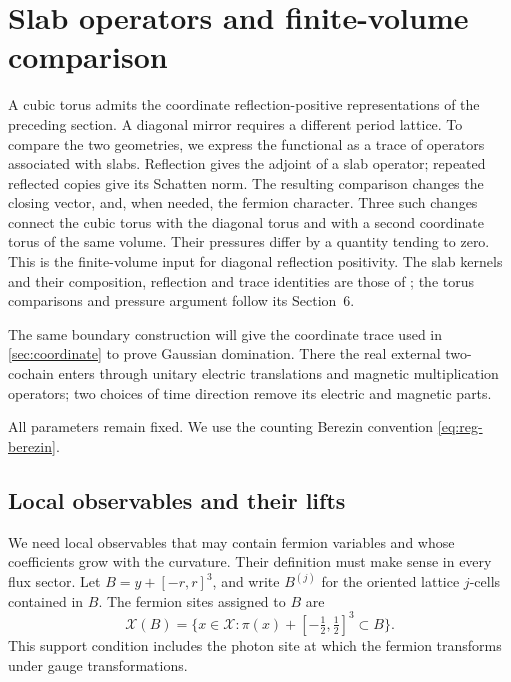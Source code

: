 \section{Slab operators and finite-volume comparison}\label{sec:slab-comparison}

A cubic torus admits the coordinate reflection-positive representations
of the preceding section. A diagonal mirror requires a different period
lattice. To compare the two geometries, we express the functional as a
trace of operators associated with slabs. Reflection gives the adjoint
of a slab operator; repeated reflected copies give its Schatten norm.
The resulting comparison changes the closing vector, and, when needed,
the fermion character. Three such changes connect the cubic torus with
the diagonal torus and with a second coordinate torus of the same volume.
Their pressures differ by a quantity tending to zero. This is the
finite-volume input for diagonal reflection positivity. The slab kernels
and their composition, reflection and trace identities are those of
\cite[Sections~5.1--5.7, Theorem~5.29]{ChamberQED}; the torus comparisons
and pressure argument follow its Section~6.

The same boundary construction will give the coordinate trace used in
\cref{sec:coordinate} to prove Gaussian domination. There the real
external two-cochain enters through unitary electric translations and
magnetic multiplication operators; two choices of time direction
remove its electric and magnetic parts.

All parameters remain fixed. We use the counting Berezin convention
\eqref{eq:reg-berezin}.

\subsection{Local observables and their lifts}\label{subsec:slab-local}

We need local observables that may contain fermion variables and whose
coefficients grow with the curvature. Their definition must make sense
in every flux sector. Let $B=y+[-r,r]^3$, and write $B^{(j)}$ for the
oriented lattice $j$-cells contained in $B$. The fermion sites assigned
to $B$ are
\[
 \mathcal X(B)=\{x\in\mathcal X:
          \pi(x)+[-\tfrac12,\tfrac12]^3\subset B\}.
\]
This support condition includes the photon site at which the fermion
transforms under gauge transformations.

